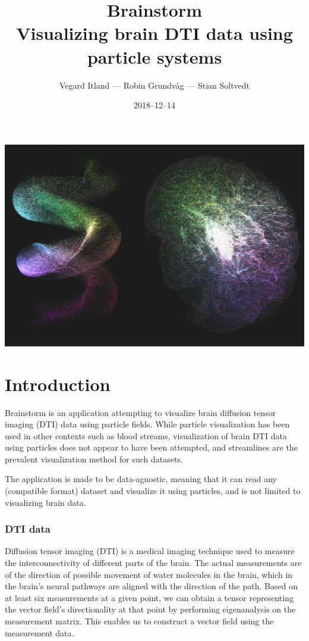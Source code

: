 \documentclass{article}
\title{%
Brainstorm\\
\large Visualizing brain DTI data using particle systems}
\author{Vegard Itland --- Robin Grundvåg --- Stian Soltvedt}
\date{2018--12--14}
\begin{document}
\maketitle
{}
\includegraphics[width=\textwidth]{brainstorm.png}
\section*{Introduction}

Brainstorm is an application attempting to visualize brain diffusion tensor imaging (DTI) data using particle fields. While particle visualization has been used in other contexts such as blood streams, visualization of brain DTI data using particles does not appear to have been attempted, and streamlines are the prevalent visualization method for such datasets.

The application is made to be data-agnostic, meaning that it can read any (compatible format) dataset and visualize it using particles, and is not limited to visualizing brain data.

\subsubsection*{DTI data}

Diffusion tensor imaging (DTI) is a medical imaging technique used to measure the interconnectivity of different parts of the brain. The actual measurements are of the direction of possible movement of water molecules in the brain, which in the brain's neural pathways are aligned with the direction of the path. Based on at least six measurements at a given point, we can obtain a tensor representing the vector field's directionality at that point by performing eigenanalysis on the measurement matrix. This enables us to construct a vector field using the measurement data.
\end{document}
